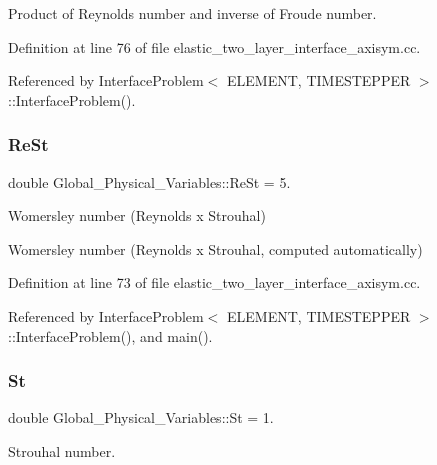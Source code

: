 Product of Reynolds number and inverse of Froude number. 



Definition at line 76 of file elastic\+\_\+two\+\_\+layer\+\_\+interface\+\_\+axisym.\+cc.



Referenced by Interface\+Problem$<$ E\+L\+E\+M\+E\+N\+T, T\+I\+M\+E\+S\+T\+E\+P\+P\+E\+R $>$\+::\+Interface\+Problem().

\mbox{\label{namespaceGlobal__Physical__Variables_a085ee4bf968ffdd01a41b8c41864f907}} 
\subsubsection{\texorpdfstring{Re\+St}{ReSt}}
{\footnotesize\ttfamily double Global\+\_\+\+Physical\+\_\+\+Variables\+::\+Re\+St = 5.}



Womersley number (Reynolds x Strouhal) 

Womersley number (Reynolds x Strouhal, computed automatically) 

Definition at line 73 of file elastic\+\_\+two\+\_\+layer\+\_\+interface\+\_\+axisym.\+cc.



Referenced by Interface\+Problem$<$ E\+L\+E\+M\+E\+N\+T, T\+I\+M\+E\+S\+T\+E\+P\+P\+E\+R $>$\+::\+Interface\+Problem(), and main().

\mbox{\label{namespaceGlobal__Physical__Variables_a4b6ef72bd221361c37f5b9a4a6899afc}} 
\subsubsection{\texorpdfstring{St}{St}}
{\footnotesize\ttfamily double Global\+\_\+\+Physical\+\_\+\+Variables\+::\+St = 1.}



Strouhal number. 



